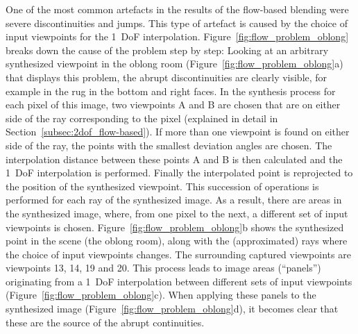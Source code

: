 One of the most common artefacts in the results of the flow-based blending were severe discontinuities and jumps. This type of artefact is caused by the choice of input viewpoints for the 1~DoF interpolation. Figure~\ref{fig:flow_problem_oblong} breaks down the cause of the problem step by step: Looking at an arbitrary synthesized viewpoint in the oblong room (Figure~\ref{fig:flow_problem_oblong}a) that displays this problem, the abrupt discontinuities are clearly visible, for example in the rug in the bottom and right faces. 
In the synthesis process for each pixel of this image, two viewpoints A and B are chosen that are on either side of the ray corresponding to the pixel (explained in detail in Section~\ref{subsec:2dof_flow-based}). If more than one viewpoint is found on either side of the ray, the points with the smallest deviation angles are chosen. The interpolation distance between these points A and B is then calculated and the 1~DoF interpolation is performed. Finally the interpolated point is reprojected to the position of the synthesized viewpoint.
This succession of operations is performed for each ray of the synthesized image. As a result, there are areas in the synthesized image, where, from one pixel to the next, a different set of input viewpoints is chosen.
Figure~\ref{fig:flow_problem_oblong}b shows the synthesized point in the scene (the oblong room), along with the (approximated) rays where the choice of input viewpoints changes. The surrounding captured viewpoints are viewpoints 13, 14, 19 and 20.
This process leads to image areas (``panels'') originating from a 1~DoF interpolation between different sets of input viewpoints (Figure~\ref{fig:flow_problem_oblong}c). When applying these panels to the synthesized image (Figure~\ref{fig:flow_problem_oblong}d), it becomes clear that these are the source of the abrupt continuities.

